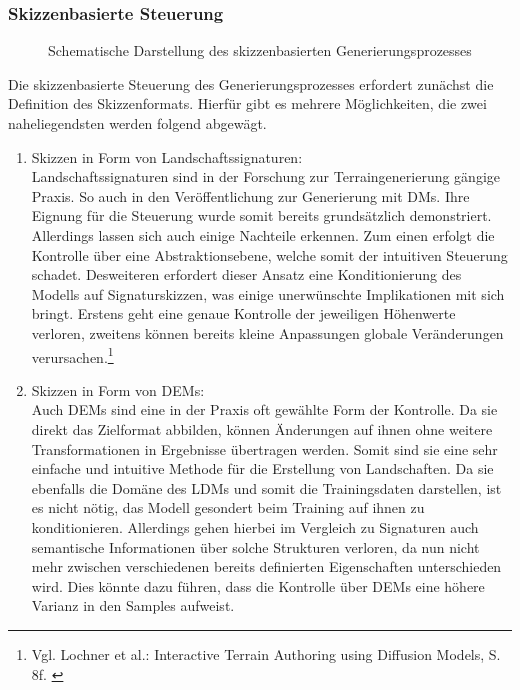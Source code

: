 \subsubsection {Skizzenbasierte Steuerung}

\begin{figure}[htbp]
    \centering
    \caption{Schematische Darstellung des skizzenbasierten Generierungsprozesses}
    \label{fig:guided_method}
\end{figure}
Die skizzenbasierte Steuerung des Generierungsprozesses erfordert zunächst die Definition des Skizzenformats. Hierfür gibt es mehrere Möglichkeiten, die zwei naheliegendsten werden folgend abgewägt. 
\begin{enumerate}
    \item Skizzen in Form von Landschaftssignaturen: \\
    Landschaftssignaturen sind in der Forschung zur Terraingenerierung gängige Praxis. So auch in den Veröffentlichung zur Generierung mit \ac{DM}s. Ihre Eignung für die Steuerung wurde somit bereits grundsätzlich demonstriert. \\
    Allerdings lassen sich auch einige Nachteile erkennen. Zum einen erfolgt die Kontrolle über eine Abstraktionsebene, welche somit der intuitiven Steuerung schadet. Desweiteren erfordert dieser Ansatz eine Konditionierung des Modells auf Signaturskizzen, was einige unerwünschte Implikationen mit sich bringt. Erstens geht eine genaue Kontrolle der jeweiligen Höhenwerte verloren, zweitens können bereits kleine Anpassungen globale Veränderungen verursachen.\footnote{
        Vgl. Lochner et al.: Interactive Terrain Authoring using Diffusion Models, S. 8f. 
        \cite{lochner2023interactive}
    }
    \item Skizzen in Form von \ac{DEM}s: \\
    Auch \ac{DEM}s sind eine in der Praxis oft gewählte Form der Kontrolle. Da sie direkt das Zielformat abbilden, können Änderungen auf ihnen ohne weitere Transformationen in Ergebnisse übertragen werden. Somit sind sie eine sehr einfache und intuitive Methode für die Erstellung von Landschaften. Da sie ebenfalls die Domäne des \ac{LDM}s und somit die Trainingsdaten darstellen, ist es nicht nötig, das Modell gesondert beim Training auf ihnen zu konditionieren. Allerdings gehen hierbei im Vergleich zu Signaturen auch semantische Informationen über solche Strukturen verloren, da nun nicht mehr zwischen verschiedenen bereits definierten Eigenschaften unterschieden wird. Dies könnte dazu führen, dass die Kontrolle über \ac{DEM}s eine höhere Varianz in den Samples aufweist.
\end{enumerate}

